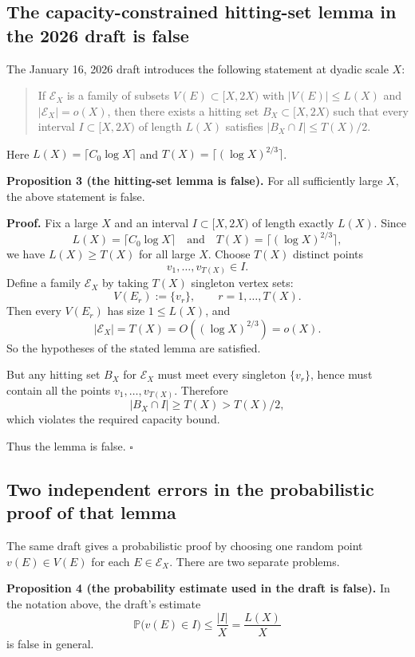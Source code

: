 \subsection{The capacity-constrained hitting-set lemma in the 2026 draft is false}

The January 16, 2026 draft introduces the following statement at dyadic scale $X$:

\begin{quote}
If $\mathcal E_X$ is a family of subsets $V(E)\subset [X,2X)$ with $|V(E)|\le L(X)$ and $|\mathcal E_X|=o(X)$, then there exists a hitting set $B_X\subset [X,2X)$ such that every interval $I\subset [X,2X)$ of length $L(X)$ satisfies $|B_X\cap I|\le T(X)/2$.
\end{quote}

Here $L(X)=\lceil C_0\log X\rceil$ and $T(X)=\lceil (\log X)^{2/3}\rceil$.

\textbf{Proposition 3 (the hitting-set lemma is false).}
For all sufficiently large $X$, the above statement is false.

\textbf{Proof.}
Fix a large $X$ and an interval $I\subset [X,2X)$ of length exactly $L(X)$. Since
\[
L(X)=\lceil C_0\log X\rceil \quad\text{and}\quad T(X)=\lceil (\log X)^{2/3}\rceil,
\]
we have $L(X)\ge T(X)$ for all large $X$. Choose $T(X)$ distinct points
\[
v_1,\dots,v_{T(X)}\in I.
\]
Define a family $\mathcal E_X$ by taking $T(X)$ singleton vertex sets:
\[
V(E_r):=\{v_r\},\qquad r=1,\dots,T(X).
\]
Then every $V(E_r)$ has size $1\le L(X)$, and
\[
|\mathcal E_X|=T(X)=O((\log X)^{2/3})=o(X).
\]
So the hypotheses of the stated lemma are satisfied.

But any hitting set $B_X$ for $\mathcal E_X$ must meet every singleton $\{v_r\}$, hence must contain all the points $v_1,\dots,v_{T(X)}$. Therefore
\[
|B_X\cap I|\ge T(X)>T(X)/2,
\]
which violates the required capacity bound.

Thus the lemma is false. \hfill$\square$

\subsection{Two independent errors in the probabilistic proof of that lemma}

The same draft gives a probabilistic proof by choosing one random point $v(E)\in V(E)$ for each $E\in \mathcal E_X$. There are two separate problems.

\textbf{Proposition 4 (the probability estimate used in the draft is false).}
In the notation above, the draft's estimate
\[
\mathbb P\bigl(v(E)\in I\bigr)\le \frac{|I|}{X}=\frac{L(X)}{X}
\]
is false in general.

